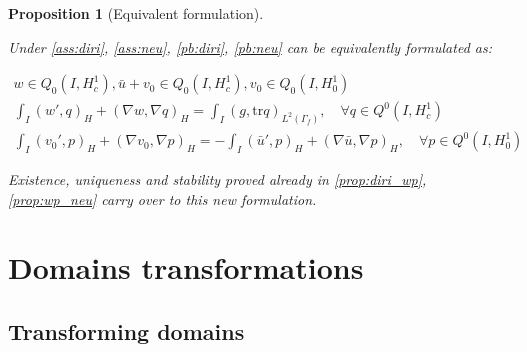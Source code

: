 \documentclass[english,a4paper,10pt,oneside]{scrbook}	%
\theoremstyle{break}
\newtheorem{prop}[equation]{Proposition}
\theoremstyle{remark}
\newcommand{\tr}{\text{tr}}
\begin{document}
\begin{prop}[Equivalent formulation]
\label{prop:eq_form}

Under \cref{ass:diri}, \cref{ass:neu}, \cref{pb:diri}, \cref{pb:neu} can be equivalently formulated as:

\begin{align*}
w \in Q_0(I, H^1_c), \bar{u}+v_0 \in Q_0(I,H^1_c), v_0 \in Q_0(I,H^1_0) \\
\int_I ( w' , q)_H+ (\nabla w, \nabla q)_H = \int_I(g,\tr q)_{L^2(\Gamma_f)}, \quad \forall q \in Q^0(I, H^1_c) \\
\int_I (v_0',p)_H + (\nabla v_0, \nabla p)_H= -\int_I(\bar{u}',p)_H+(\nabla \bar{u}, \nabla p)_H, \quad \forall p \in Q^0(I, H^1_0) 
\end{align*}

Existence, uniqueness and stability proved already in  \cref{prop:diri_wp}, \cref{prop:wp_neu} carry over to this new formulation.

\end{prop}

\chapter{Domains transformations}

\section{Transforming domains}
\end{document}
